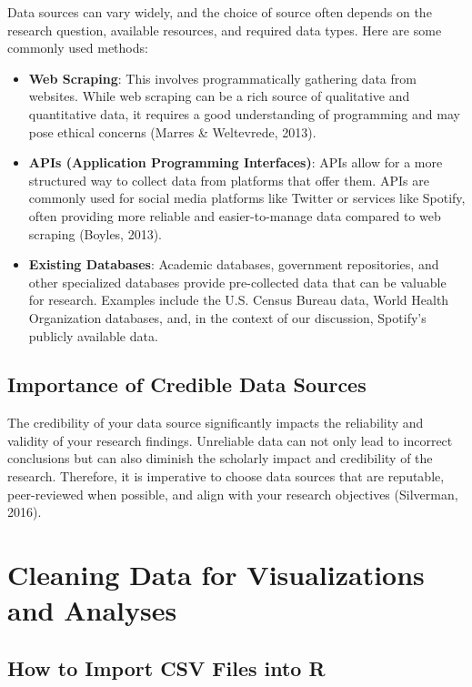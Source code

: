 \documentclass[
]{book}
\begin{document}
Data sources can vary widely, and the choice of source often depends on the research question, available resources, and required data types. Here are some commonly used methods:

\begin{itemize}
\item
  \textbf{Web Scraping}: This involves programmatically gathering data from websites. While web scraping can be a rich source of qualitative and quantitative data, it requires a good understanding of programming and may pose ethical concerns (Marres \& Weltevrede, 2013).
\item
  \textbf{APIs (Application Programming Interfaces)}: APIs allow for a more structured way to collect data from platforms that offer them. APIs are commonly used for social media platforms like Twitter or services like Spotify, often providing more reliable and easier-to-manage data compared to web scraping (Boyles, 2013).
\item
  \textbf{Existing Databases}: Academic databases, government repositories, and other specialized databases provide pre-collected data that can be valuable for research. Examples include the U.S. Census Bureau data, World Health Organization databases, and, in the context of our discussion, Spotify's publicly available data.
\end{itemize}

\subsection*{Importance of Credible Data Sources}\label{importance-of-credible-data-sources}

The credibility of your data source significantly impacts the reliability and validity of your research findings. Unreliable data can not only lead to incorrect conclusions but can also diminish the scholarly impact and credibility of the research. Therefore, it is imperative to choose data sources that are reputable, peer-reviewed when possible, and align with your research objectives (Silverman, 2016).

\section{Cleaning Data for Visualizations and Analyses}\label{cleaning-data-for-visualizations-and-analyses}

\subsection*{How to Import CSV Files into R}\label{how-to-import-csv-files-into-r}
\end{document}
